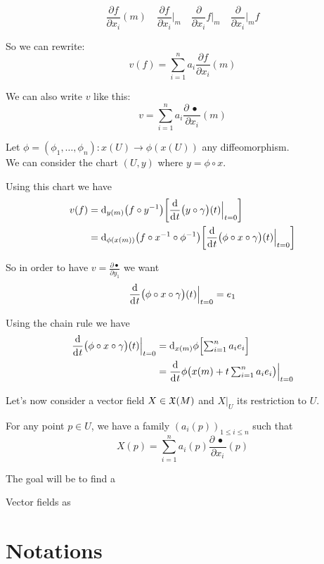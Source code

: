 		$$
			\frac{\partial{f}}{\partial{x_i}}(m) \quad \frac{\partial{f}}{\partial{x_i}}\Big|_m \quad \frac{\partial}{\partial{x_i}} f \Big|_m \quad \frac{\partial}{\partial{x_i}} \Big|_m f
		$$

		So we can rewrite:
		$$
			v(f) = \sum_{i=1}^n a_i \frac{\partial f}{\partial{x_i}}(m)
		$$

		We can also write $v$ like this:
		$$
			v = \sum_{i=1}^n a_i \frac{\partial \,\bullet\,}{\partial{x_i}}(m)
		$$

		Let $\phi = (\phi_1, \ldots, \phi_n): x(U) \to \phi(x(U))$ any diffeomorphism.\\
		We can consider the chart $(U, y)$ where $y = \phi \circ x$.

		Using this chart we have
		\begin{align*}
			v(f) &= \di[y(m)] \big( f \circ y^{-1} \big) \bigg[ \frac{\d}{\di{t}} \big( y \circ \gamma \big)(t) \Big|_{t=0} \bigg] \\
			     &= \di[\phi(x(m))] \big( f \circ x^{-1} \circ \phi^{-1} \big) \bigg[ \frac{\d}{\di{t}} \big( \phi \circ x \circ \gamma \big)(t) \Big|_{t=0} \bigg]
		\end{align*}

		So in order to have $v = \frac{\partial{\bullet}}{\partial{y_1}}$ we want
		$$
			\frac{\d}{\di{t}} \big( \phi \circ x \circ \gamma \big)(t) \Big|_{t=0} = e_1
		$$

		Using the chain rule we have
		\begin{align*}
			\frac{\d}{\di{t}} \big( \phi \circ x \circ \gamma \big)(t) \Big|_{t=0} &= \di[x(m)]{\phi} \Big[ {\textstyle\sum_{i=1}^n a_i e_i} \Big] \\
			                                                                       &= \frac{\d}{\di{t}} \phi\big( x(m) + {\textstyle t \sum_{i=1}^n a_i e_i} \big) \Big|_{t=0}
		\end{align*}

		Let's now consider a vector field $X \in \mathfrak{X}(M)$ and $X|_U$ its restriction to $U$.

		For any point $p \in U$, we have a family $(a_i(p))_{1 \leq i \leq n}$ such that
		$$
			X(p) = \sum_{i=1}^n a_i(p) \frac{\partial \,\bullet\,}{\partial{x_i}}(p)
		$$

		The goal will be to find a 

		Vector fields as 

\section{Notations}

